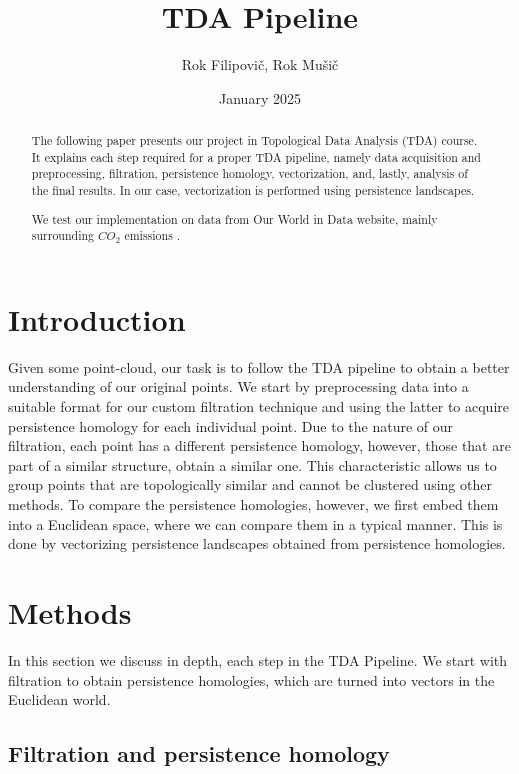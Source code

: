 \documentclass{article}
\title{TDA Pipeline}
\author{Rok Filipovič, Rok Mušič}
\date{January 2025}
\begin{document}
\maketitle

\begin{abstract}
    The following paper presents our project in Topological Data Analysis (TDA) course. 
    It explains each step required for a proper TDA pipeline, namely data acquisition and preprocessing, filtration, persistence homology, vectorization, and, lastly, analysis of the final results.
    In our case, vectorization is performed using persistence landscapes.
    
    We test our implementation on data from Our World in Data website, mainly surrounding $CO_2$ emissions \cite{owid-co2-and-greenhouse-gas-emissions}.
\end{abstract}

\section{Introduction}

Given some point-cloud, our task is to follow the TDA pipeline to obtain a better understanding of our original points. 
We start by preprocessing data into a suitable format for our custom filtration technique and using the latter to acquire persistence homology for each individual point. Due to the nature of our filtration, each point has a different persistence homology, however, those that are part of a similar structure, obtain a similar one. 
This characteristic allows us to group points that are topologically similar and cannot be clustered using other methods. 
To compare the persistence homologies, however, we first embed them into a Euclidean space, where we can compare them in a typical manner.
This is done by vectorizing persistence landscapes obtained from persistence homologies.

\section{Methods}
\label{sec2}

In this section we discuss in depth, each step in the TDA Pipeline. 
We start with filtration to obtain persistence homologies, which are turned into vectors in the Euclidean world. 

\subsection{Filtration and persistence homology}
\end{document}
